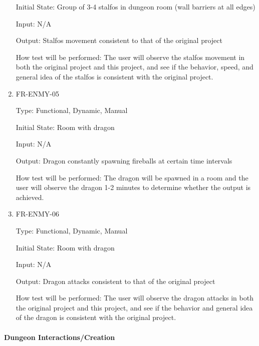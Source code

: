 \documentclass[12pt, titlepage]{article}
\begin{document}
\begin{enumerate}
Initial State: Group of 3-4 stalfos in dungeon room (wall barriers at all edges)

Input: N/A

Output: Stalfos movement consistent to that of the original project

How test will be performed: The user will observe the stalfos movement in both the original project and this project, and see if the behavior, speed, and general idea of the stalfos is consistent with the original project.

\item{FR-ENMY-05\\}

Type: Functional, Dynamic, Manual

Initial State: Room with dragon

Input: N/A

Output: Dragon constantly spawning fireballs at certain time intervals

How test will be performed: The dragon will be spawned in a room and the user will observe the dragon 1-2 minutes to determine whether the output is achieved.

\item{FR-ENMY-06\\}

Type: Functional, Dynamic, Manual

Initial State: Room with dragon

Input: N/A

Output: Dragon attacks consistent to that of the original project

How test will be performed: The user will observe the dragon attacks in both the original project and this project, and see if the behavior and general idea of the dragon is consistent with the original project.
	
\end{enumerate}

\paragraph{Dungeon Interactions/Creation}
\end{document}

